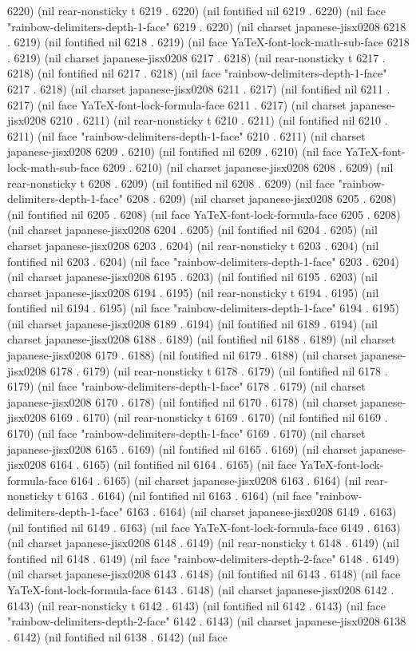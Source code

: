 6220) (nil rear-nonsticky t 6219 . 6220) (nil fontified nil 6219 . 6220) (nil face "rainbow-delimiters-depth-1-face" 6219 . 6220) (nil charset japanese-jisx0208 6218 . 6219) (nil fontified nil 6218 . 6219) (nil face YaTeX-font-lock-math-sub-face 6218 . 6219) (nil charset japanese-jisx0208 6217 . 6218) (nil rear-nonsticky t 6217 . 6218) (nil fontified nil 6217 . 6218) (nil face "rainbow-delimiters-depth-1-face" 6217 . 6218) (nil charset japanese-jisx0208 6211 . 6217) (nil fontified nil 6211 . 6217) (nil face YaTeX-font-lock-formula-face 6211 . 6217) (nil charset japanese-jisx0208 6210 . 6211) (nil rear-nonsticky t 6210 . 6211) (nil fontified nil 6210 . 6211) (nil face "rainbow-delimiters-depth-1-face" 6210 . 6211) (nil charset japanese-jisx0208 6209 . 6210) (nil fontified nil 6209 . 6210) (nil face YaTeX-font-lock-math-sub-face 6209 . 6210) (nil charset japanese-jisx0208 6208 . 6209) (nil rear-nonsticky t 6208 . 6209) (nil fontified nil 6208 . 6209) (nil face "rainbow-delimiters-depth-1-face" 6208 . 6209) (nil charset japanese-jisx0208 6205 . 6208) (nil fontified nil 6205 . 6208) (nil face YaTeX-font-lock-formula-face 6205 . 6208) (nil charset japanese-jisx0208 6204 . 6205) (nil fontified nil 6204 . 6205) (nil charset japanese-jisx0208 6203 . 6204) (nil rear-nonsticky t 6203 . 6204) (nil fontified nil 6203 . 6204) (nil face "rainbow-delimiters-depth-1-face" 6203 . 6204) (nil charset japanese-jisx0208 6195 . 6203) (nil fontified nil 6195 . 6203) (nil charset japanese-jisx0208 6194 . 6195) (nil rear-nonsticky t 6194 . 6195) (nil fontified nil 6194 . 6195) (nil face "rainbow-delimiters-depth-1-face" 6194 . 6195) (nil charset japanese-jisx0208 6189 . 6194) (nil fontified nil 6189 . 6194) (nil charset japanese-jisx0208 6188 . 6189) (nil fontified nil 6188 . 6189) (nil charset japanese-jisx0208 6179 . 6188) (nil fontified nil 6179 . 6188) (nil charset japanese-jisx0208 6178 . 6179) (nil rear-nonsticky t 6178 . 6179) (nil fontified nil 6178 . 6179) (nil face "rainbow-delimiters-depth-1-face" 6178 . 6179) (nil charset japanese-jisx0208 6170 . 6178) (nil fontified nil 6170 . 6178) (nil charset japanese-jisx0208 6169 . 6170) (nil rear-nonsticky t 6169 . 6170) (nil fontified nil 6169 . 6170) (nil face "rainbow-delimiters-depth-1-face" 6169 . 6170) (nil charset japanese-jisx0208 6165 . 6169) (nil fontified nil 6165 . 6169) (nil charset japanese-jisx0208 6164 . 6165) (nil fontified nil 6164 . 6165) (nil face YaTeX-font-lock-formula-face 6164 . 6165) (nil charset japanese-jisx0208 6163 . 6164) (nil rear-nonsticky t 6163 . 6164) (nil fontified nil 6163 . 6164) (nil face "rainbow-delimiters-depth-1-face" 6163 . 6164) (nil charset japanese-jisx0208 6149 . 6163) (nil fontified nil 6149 . 6163) (nil face YaTeX-font-lock-formula-face 6149 . 6163) (nil charset japanese-jisx0208 6148 . 6149) (nil rear-nonsticky t 6148 . 6149) (nil fontified nil 6148 . 6149) (nil face "rainbow-delimiters-depth-2-face" 6148 . 6149) (nil charset japanese-jisx0208 6143 . 6148) (nil fontified nil 6143 . 6148) (nil face YaTeX-font-lock-formula-face 6143 . 6148) (nil charset japanese-jisx0208 6142 . 6143) (nil rear-nonsticky t 6142 . 6143) (nil fontified nil 6142 . 6143) (nil face "rainbow-delimiters-depth-2-face" 6142 . 6143) (nil charset japanese-jisx0208 6138 . 6142) (nil fontified nil 6138 . 6142) (nil face 